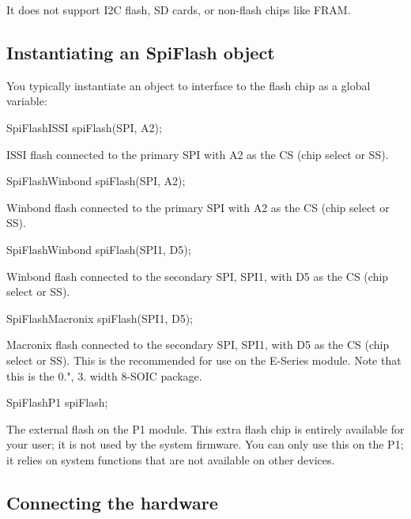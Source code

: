 It does not support I2C flash, SD cards, or non-\/flash chips like F\+R\+AM.

\subsection*{Instantiating an Spi\+Flash object}

You typically instantiate an object to interface to the flash chip as a global variable\+:


\begin{DoxyCode}
SpiFlashISSI spiFlash(SPI, A2);
\end{DoxyCode}


I\+S\+SI flash connected to the primary S\+PI with A2 as the CS (chip select or SS).


\begin{DoxyCode}
SpiFlashWinbond spiFlash(SPI, A2);
\end{DoxyCode}


Winbond flash connected to the primary S\+PI with A2 as the CS (chip select or SS).


\begin{DoxyCode}
SpiFlashWinbond spiFlash(SPI1, D5);
\end{DoxyCode}


Winbond flash connected to the secondary S\+PI, S\+P\+I1, with D5 as the CS (chip select or SS).


\begin{DoxyCode}
SpiFlashMacronix spiFlash(SPI1, D5);
\end{DoxyCode}


Macronix flash connected to the secondary S\+PI, S\+P\+I1, with D5 as the CS (chip select or SS). This is the recommended for use on the E-\/\+Series module. Note that this is the 0.", 3.\+90mm width 8-\/\+S\+O\+IC package.


\begin{DoxyCode}
SpiFlashP1 spiFlash;
\end{DoxyCode}


The external flash on the P1 module. This extra flash chip is entirely available for your user; it is not used by the system firmware. You can only use this on the P1; it relies on system functions that are not available on other devices.

\subsection*{Connecting the hardware}


